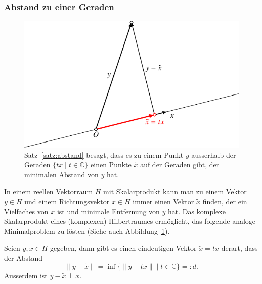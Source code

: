 \subsubsection{Abstand zu einer Geraden}
\begin{figure}
\centering
\includegraphics{chapters/1-geometrie/images/abstand.pdf}
\caption{Satz~\ref{satz:abstand} besagt, dass es zu einem Punkt $y$ ausserhalb
der Geraden $\{tx\;|\;t\in\mathbb C\}$ einen Punkte $\tilde{x}$ auf der
Geraden gibt, der minimalen Abstand von $y$ hat.
\label{figure:geradenabstand}}
\end{figure}
In einem reellen Vektorraum $H$ mit Skalarprodukt kann man zu einem Vektor
$y\in H$ und einem Richtungsvektor $x\in H$ immer einen Vektor
$\tilde{x}$ finden, der ein Vielfaches von $x$ ist und minimale Entfernung
von $y$ hat.
Das komplexe Skalarprodukt eines (komplexen) Hilbertraumes ermöglicht, 
das folgende analoge Minimalproblem zu lösten (Siehe auch
Abbildung~\ref{figure:geradenabstand}).

\begin{satz}
\label{satz:abstand}
Seien $y,x\in H$ gegeben, dann gibt es einen eindeutigen Vektor $\tilde x=tx$
derart, dass der Abstand
\[
\| y - \tilde{x}\|
=
\inf \{ \| y-t x\|\;|\; t \in \mathbb C\}
=:d.
\]
Ausserdem ist $y-\tilde{x}\perp x$.
\end{satz}

